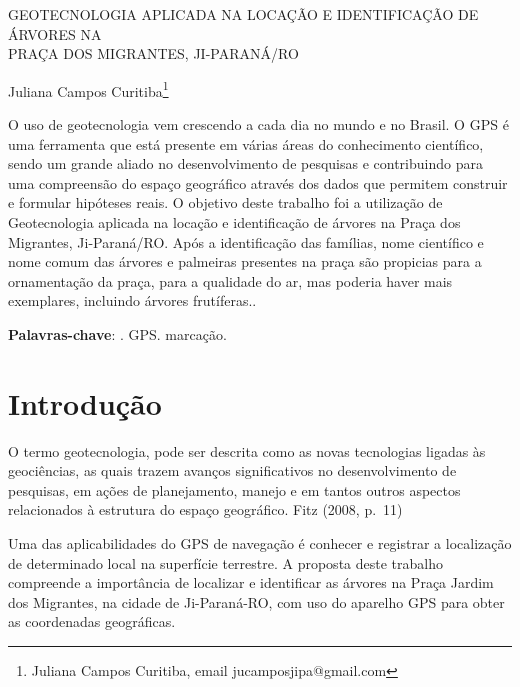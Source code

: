 \documentclass[article,12pt,onesidea,4paper,english,brazil]{abntex2}
\begin{document}
	
	
	\frenchspacing 
	
	\begin{center}
		\LARGE GEOTECNOLOGIA APLICADA NA LOCAÇÃO E IDENTIFICAÇÃO DE ÁRVORES NA \\PRAÇA DOS MIGRANTES, JI-PARANÁ/RO
		
		\normalsize
		Juliana Campos Curitiba\footnote{Juliana Campos Curitiba, email jucamposjipa@gmail.com} 
		
	\end{center}
	
	\begin{resumoumacoluna}
		 O uso de geotecnologia vem crescendo a cada dia no mundo e no Brasil. O GPS é uma ferramenta que está presente em várias áreas do conhecimento científico, sendo um grande aliado no desenvolvimento de pesquisas e contribuindo para uma compreensão do espaço geográfico através dos dados que permitem construir e formular hipóteses reais. O objetivo deste trabalho foi a utilização de Geotecnologia aplicada na locação e identificação de árvores na Praça dos Migrantes, Ji-Paraná/RO. Após a identificação das famílias, nome científico e nome comum das árvores e palmeiras presentes na praça são propicias para a ornamentação da praça, para a qualidade do ar, mas poderia haver mais exemplares, incluindo árvores frutíferas..
		
		\vspace{\onelineskip}
		
		\noindent
		\textbf{Palavras-chave}: . GPS. marcação.
		
		
	\end{resumoumacoluna}
	
	\section*{Introdução}
	
	O termo geotecnologia, pode ser descrita como as novas tecnologias ligadas às geociências, as quais trazem avanços significativos no desenvolvimento de pesquisas, em ações de planejamento, manejo e em tantos outros aspectos relacionados à estrutura do espaço geográfico. Fitz (2008, p.~11)
	
	Uma das aplicabilidades do GPS de navegação é conhecer e registrar a localização de determinado local na superfície terrestre. A proposta deste trabalho compreende a importância de localizar e identificar as árvores na Praça Jardim dos Migrantes, na cidade de Ji-Paraná-RO, com uso do aparelho GPS para obter as coordenadas geográficas.
	
\end{document}
